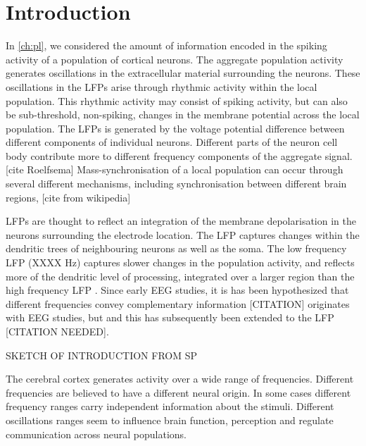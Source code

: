 \section{Introduction}

In \autoref{ch:pl}, we considered the amount of information encoded in the spiking activity of a population of cortical neurons.
The aggregate population activity generates oscillations in the extracellular material surrounding the neurons.
These oscillations in the \acp{LFP} arise through rhythmic activity within the local population.
This rhythmic activity may consist of spiking activity, but can also be sub-threshold, non-spiking, changes in the membrane potential across the local population.
The \acp{LFP} is generated by the voltage potential difference between different components of individual neurons.
Different parts of the neuron cell body contribute more to different frequency components of the aggregate signal. [cite Roelfsema]
Mass-synchronisation of a local population can occur through several different mechanisms, including synchronisation between different brain regions, [cite from wikipedia]


\acp{LFP} are thought to reflect an integration of the membrane depolarisation in the neurons surrounding the electrode location.
The \ac{LFP} captures changes within the dendritic trees of neighbouring neurons as well as the soma.
The low frequency \ac{LFP} (XXXX \si{Hz}) captures slower changes in the population activity, and reflects more of the dendritic level of processing, integrated over a larger region than the high frequency \ac{LFP} \citep{Leski2013}.
Since early \ac{EEG} studies, it is has been hypothesized that different frequencies convey complementary information [CITATION] originates with \ac{EEG} studies, but and this has subsequently been extended to the \ac{LFP} [CITATION NEEDED].


SKETCH OF INTRODUCTION FROM SP

The cerebral cortex generates activity over a wide range of frequencies. Different frequencies are believed to have a different neural origin. In some cases different frequency ranges carry independent information about the stimuli. Different oscillations ranges seem to influence brain function, perception and regulate communication across neural populations. 

